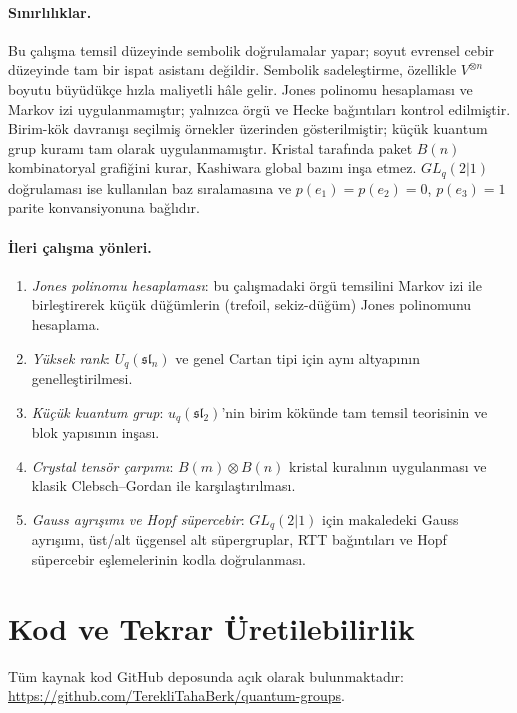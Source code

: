 \documentclass[10pt]{math}
\numberwithin{equation}{section}
\theoremstyle{plain}
\theoremstyle{definition}
\renewcommand{\sl}{\mathfrak{sl}}
\begin{document}
\paragraph{Sınırlılıklar.}
Bu çalışma temsil düzeyinde sembolik doğrulamalar yapar; soyut evrensel cebir
düzeyinde tam bir ispat asistanı değildir. Sembolik sadeleştirme, özellikle
$V^{\otimes n}$ boyutu büyüdükçe hızla maliyetli hâle gelir. Jones polinomu
hesaplaması ve Markov izi uygulanmamıştır; yalnızca örgü ve Hecke bağıntıları
kontrol edilmiştir. Birim-kök davranışı seçilmiş örnekler üzerinden
gösterilmiştir; küçük kuantum grup kuramı tam olarak uygulanmamıştır. Kristal
tarafında paket $B(n)$ kombinatoryal grafiğini kurar, Kashiwara global bazını
inşa etmez. $GL_q(2|1)$ doğrulaması ise kullanılan baz sıralamasına ve
$p(e_1)=p(e_2)=0$, $p(e_3)=1$ parite konvansiyonuna bağlıdır.

\paragraph{İleri çalışma yönleri.}
\begin{enumerate}[leftmargin=*]
  \item \emph{Jones polinomu hesaplaması}: bu çalışmadaki örgü temsilini Markov
        izi ile birleştirerek küçük düğümlerin (trefoil, sekiz-düğüm) Jones
        polinomunu hesaplama.
  \item \emph{Yüksek rank}: $U_q(\sl_n)$ ve genel Cartan tipi için aynı
        altyapının genelleştirilmesi.
  \item \emph{Küçük kuantum grup}: $u_q(\sl_2)$'nin birim kökünde tam
        temsil teorisinin ve blok yapısının inşası.
  \item \emph{Crystal tensör çarpımı}: $B(m) \otimes B(n)$ kristal
        kuralının uygulanması ve klasik Clebsch--Gordan ile karşılaştırılması.
  \item \emph{Gauss ayrışımı ve Hopf süpercebir}: $GL_q(2|1)$ için
        makaledeki Gauss ayrışımı, üst/alt üçgensel alt süpergruplar, RTT
        bağıntıları ve Hopf süpercebir eşlemelerinin kodla doğrulanması.
\end{enumerate}

\appendix
\section{Kod ve Tekrar Üretilebilirlik}

Tüm kaynak kod GitHub deposunda açık olarak bulunmaktadır:
\url{https://github.com/TerekliTahaBerk/quantum-groups}.
\end{document}
